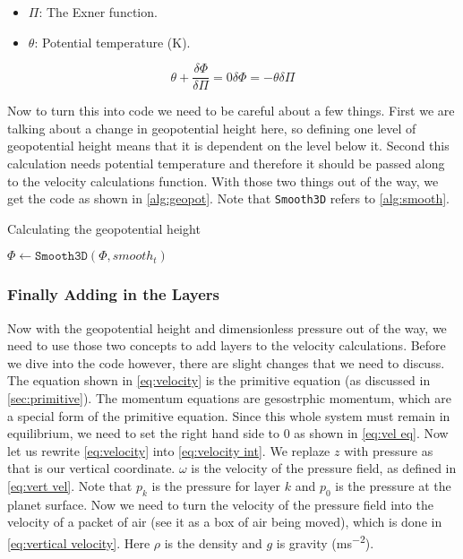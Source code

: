 \begin{itemize}
    \item $\Pi$: The Exner function.
    \item $\theta$: Potential temperature (\si{K}).
\end{itemize}

\begin{subequations}
    \begin{equation}
        \label{eq:geopot}
        \theta + \frac{\delta\Phi}{\delta\Pi} = 0
    \end{equation}
    \begin{equation}
        \label{eq:geopot final}
        \delta\Phi = -\theta\delta\Pi
    \end{equation}
\end{subequations}

Now to turn this into code we need to be careful about a few things. First we are talking about a change in geopotential height here, so defining one level of geopotential height means that it 
is dependent on the level below it. Second this calculation needs potential temperature and therefore it should be passed along to the velocity calculations function. With those two things out 
of the way, we get the code as shown in \autoref{alg:geopot}. Note that \texttt{Smooth3D} refers to \autoref{alg:smooth}.

\begin{algorithm}
    \caption{Calculating the geopotential height}
    \label{alg:geopot}
    $\Phi \leftarrow \texttt{Smooth3D}(\Phi, smooth_t)$ \;
\end{algorithm}

\subsubsection{Finally Adding in the Layers}
Now with the geopotential height and dimensionless pressure out of the way, we need to use those two concepts to add layers to the velocity calculations. Before we dive into the code however, 
there are slight changes that we need to discuss. The equation shown in \autoref{eq:velocity} is the primitive equation (as discussed in \autoref{sec:primitive}). The momentum equations are 
gesostrphic momentum, which are a special form of the primitive equation. Since this whole system must remain in equilibrium, we need to set the right hand side to $0$ as shown in 
\autoref{eq:vel eq}. Now let us rewrite \autoref{eq:velocity} into \autoref{eq:velocity int}. We replaze $z$ with pressure as that is our vertical coordinate. $\omega$ is the velocity of the 
pressure field, as defined in \autoref{eq:vert vel}. Note that $p_k$ is the pressure for layer $k$ and $p_0$ is the pressure at the planet surface. Now we need to turn the velocity of the 
pressure field into the velocity of a packet of air (see it as a box of air being moved), which is done in \autoref{eq:vertical velocity}. Here $\rho$ is the density and $g$ is gravity 
(\si{ms^{-2}}).

